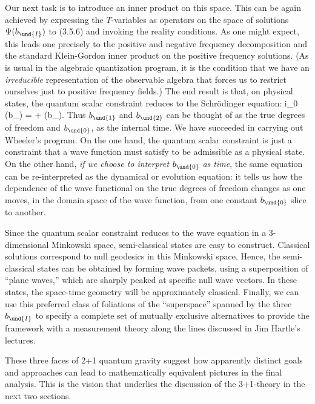 Our next task is to introduce an inner product on this space. This can be again
achieved by expressing the $T$-variables as operators on the space of
solutions $\Psi(b_{\und{I}})$ to (3.5.6) and invoking the reality conditions.
As one might expect, this leads one precisely to the positive and negative
frequency decomposition and the standard Klein-Gordon inner product on the
positive frequency solutions. (As is usual in the algebraic quantization
program, it is the condition that we have an {\it irreducible} representation
of the observable algebra that forces us to restrict ourselves just to
positive frequency fields.) The end result is that, on physical states, the
quantum scalar constraint reduces to the Schr\"odinger equation:
\bneq
i\partial_0 \Psi (b_{}) = + \circ\Psi(b_{}).
Thus $b_{\und{1}}$ and $b_{\und{2}}$ can be thought of as the true degrees of
freedom and $b_{\und{0}}$, as the internal time. We have succeeded in carrying
out Wheeler's program. On the one hand,  the quantum scalar constraint
is just a constraint that a wave function must satisfy to be admissible as a
physical state. On the other hand, {\it if we choose to interpret}
$b_{\und{0}}$ {\it as time}, the same equation can be re-interpreted as
the dynamical or evolution equation: it tells us how the dependence of the
wave functional on the true degrees of freedom changes as one moves, in
the domain space of the wave function, from one constant $b_{\und{0}}$ slice
to another.

Since the quantum scalar constraint reduces to the wave equation in a
3-dimensional Minkowski space, semi-classical states are easy to construct.
Classical solutions correspond to null geodesics in this Minkowski
space. Hence, the semi-classical states can be obtained by forming wave
packets, using a superposition of ``plane waves,''  which are sharply
peaked at specific null wave vectors. In these states, the space-time
geometry will be approximately classical.
Finally, we can use this preferred class of foliations of the ``superspace''
spanned by the three $b_{\und{I}}$ to specify a complete set of mutually
exclusive alternatives to provide the framework with a measurement theory
along the lines discussed in Jim Hartle's lectures.
\medskip

These three faces of 2+1 quantum gravity suggest how apparently distinct
goals and approaches can lead to mathematically equivalent pictures in the
final analysis. This is the vision that underlies the discussion of the
3+1-theory in the next two sections.

